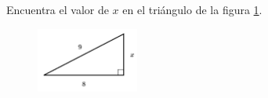 \question[15]  Encuentra el valor de $x$ en el triángulo de la figura \ref{fig:lados_pitagoras_34}.
\begin{figure}[H]
    \begin{center}
        \includegraphics[width=0.3\textwidth]{../images/lados_pitagoras_34.png}
    \end{center}
    \caption{}
    \label{fig:lados_pitagoras_34}
\end{figure}